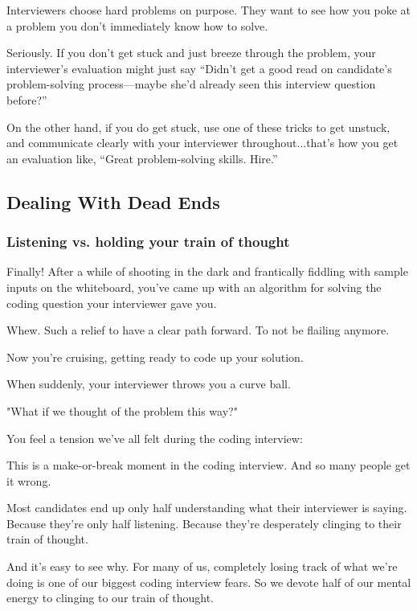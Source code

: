 \documentclass{article}
\begin{document}
Interviewers choose hard problems on purpose. They want to see how you poke at a problem you don’t immediately know how to solve.

Seriously. If you don’t get stuck and just breeze through the problem, your interviewer’s evaluation might just say “Didn’t get a good read on candidate’s problem-solving process—maybe she’d already seen this interview question before?”

On the other hand, if you do get stuck, use one of these tricks to get unstuck, and communicate clearly with your interviewer throughout...that’s how you get an evaluation like, “Great problem-solving skills. Hire.”






\subsection{Dealing With Dead Ends}

\subsubsection{Listening vs. holding your train of thought}

Finally! After a while of shooting in the dark and frantically fiddling with sample inputs on the whiteboard, you've came up with an algorithm for solving the coding question your interviewer gave you.

Whew. Such a relief to have a clear path forward. To not be flailing anymore.

Now you're cruising, getting ready to code up your solution.

When suddenly, your interviewer throws you a curve ball.

"What if we thought of the problem this way?"

You feel a tension we've all felt during the coding interview:


This is a make-or-break moment in the coding interview. And so many people get it wrong.

Most candidates end up only half understanding what their interviewer is saying. Because they're only half listening. Because they're desperately clinging to their train of thought.

And it's easy to see why. For many of us, completely losing track of what we're doing is one of our biggest coding interview fears. So we devote half of our mental energy to clinging to our train of thought.
\end{document}
